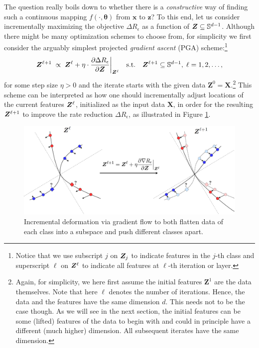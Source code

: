 \documentclass[../../book-main.tex]{subfiles}
\begin{document}
The question really boils down to whether there is a {\em constructive} way of finding such a continuous mapping $f(\cdot,\bm \theta)$ from $\bm x$ to $\bm z$? To this end, let us consider incrementally maximizing the objective $\Delta R_{\epsilon}$ as a function of $\bm{Z} \subseteq \mathbb{S}^{d-1}$. Although there might be many optimization schemes to choose from, for simplicity we first consider the arguably simplest projected {\em gradient ascent} (PGA)  scheme:\footnote{Notice that we use subscript $j$ on $\bm{Z}_j$ to indicate features in the $j$-th class and superscript $\ell$ on $\bm{Z}^{\ell}$ to indicate all features at $\ell$-th iteration or layer.} 
\begin{equation}
\bm Z^{\ell+1}   \; \propto \; \bm Z^{\ell} + \eta \cdot \frac{\partial \Delta R_{\epsilon}}{\partial \bm Z}\bigg|_{\bm{Z}^{\ell}}
\quad \mbox{s.t.} \quad \bm{Z}^{\ell+1} \subseteq \mathbb{S}^{d-1}, \; \ell = 1, 2, \ldots,
\label{eqn:gradient-descent}
\end{equation}
for some step size $\eta >0$ and the iterate starts with the given data $\bm Z^{0} = \bm X$.\footnote{Again, for simplicity, we here first assume the initial features $\bm Z^{1}$ are the data themselves. Note that here $\ell$ denotes the number of iterations. Hence, the data and the features have the same dimension $d$. This needs not to be the case though. As we will see in the next section, the initial features can be some (lifted) features of the data to begin with and could in principle have a different (much higher) dimension. All subsequent iterates have the same dimension.}
This scheme can be interpreted as how one should incrementally adjust locations of the current features $\bm{Z}^\ell$, initialized as the input data $\bm X$, in order for the resulting $\bm{Z}^{\ell +1}$ to improve the rate reduction $\Delta R_{\epsilon}$, as illustrated in Figure \ref{fig:gradient-flow}. 
\begin{figure}
\centering
    \includegraphics[width=0.85\linewidth]{figs_chap4/redu_gradient_diagram.png} 
    \caption{Incremental deformation via gradient flow to both flatten data of each class into a subspace and push different classes apart.} 
    \label{fig:gradient-flow}
\end{figure} 
\end{document}
